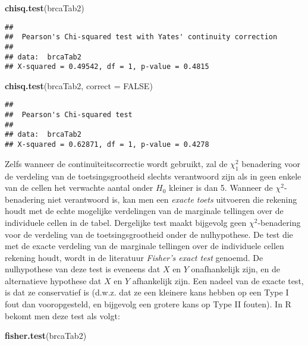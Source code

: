 \documentclass[12pt,dutch,coursenotes]{book}
\newenvironment{Shaded}{\begin{snugshade}}{\end{snugshade}}
\newcommand{\KeywordTok}[1]{\textcolor[rgb]{0.13,0.29,0.53}{\textbf{#1}}}
\newcommand{\DataTypeTok}[1]{\textcolor[rgb]{0.13,0.29,0.53}{#1}}
\newcommand{\OtherTok}[1]{\textcolor[rgb]{0.56,0.35,0.01}{#1}}
\newcommand{\NormalTok}[1]{#1}
\theoremstyle{definition}
\theoremstyle{definition}
\theoremstyle{definition}
\theoremstyle{remark}
\begin{document}
\begin{Shaded}
\begin{Highlighting}[]
\KeywordTok{chisq.test}\NormalTok{(brcaTab2)}
\end{Highlighting}
\end{Shaded}

\begin{verbatim}
## 
##  Pearson's Chi-squared test with Yates' continuity correction
## 
## data:  brcaTab2
## X-squared = 0.49542, df = 1, p-value = 0.4815
\end{verbatim}

\begin{Shaded}
\begin{Highlighting}[]
\KeywordTok{chisq.test}\NormalTok{(brcaTab2, }\DataTypeTok{correct =} \OtherTok{FALSE}\NormalTok{)}
\end{Highlighting}
\end{Shaded}

\begin{verbatim}
## 
##  Pearson's Chi-squared test
## 
## data:  brcaTab2
## X-squared = 0.62871, df = 1, p-value = 0.4278
\end{verbatim}

Zelfs wanneer de continuïteitscorrectie wordt gebruikt, zal de
\(\chi^2_1\) benadering voor de verdeling van de toetsingsgrootheid
slechts verantwoord zijn als in geen enkele van de cellen het verwachte
aantal onder \(H_0\) kleiner is dan 5. Wanneer de \(\chi^2\)-benadering
niet verantwoord is, kan men een \emph{exacte toets} uitvoeren die
rekening houdt met de echte mogelijke verdelingen van de marginale
tellingen over de individuele cellen in de tabel. Dergelijke test maakt
bijgevolg geen \(\chi^2\)-benadering voor de verdeling van de
toetsingsgrootheid onder de nulhypothese. De test die met de exacte
verdeling van de marginale tellingen over de individuele cellen rekening
houdt, wordt in de literatuur \emph{Fisher's exact test} genoemd. De
nulhypothese van deze test is eveneens dat \(X\) en \(Y\) onafhankelijk
zijn, en de alternatieve hypothese dat \(X\) en \(Y\) afhankelijk zijn.
Een nadeel van de exacte test, is dat ze conservatief is (d.w.z. dat ze
een kleinere kans hebben op een Type I fout dan vooropgesteld, en
bijgevolg een grotere kans op Type II fouten). In R bekomt men deze test
als volgt:

\begin{Shaded}
\begin{Highlighting}[]
\KeywordTok{fisher.test}\NormalTok{(brcaTab2)}
\end{Highlighting}
\end{Shaded}
\end{document}
